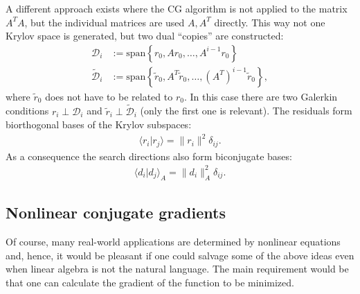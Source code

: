     A different approach exists where the CG algorithm is not applied to the matrix $A^T\!A$, but the individual matrices are used $A,A^T$ directly. This way not one Krylov space is generated, but two dual ``copies'' are constructed:
    \begin{align*}
        \mathcal{D}_i &:= \mathrm{span}\left\{r_0,Ar_0,\ldots,A^{i-1}r_0\right\}\\
        \widetilde{\mathcal{D}}_i &:= \mathrm{span}\left\{\widetilde{r}_0,A^T\widetilde{r}_0,\ldots,(A^T)^{i-1}\widetilde{r}_0\right\},
    \end{align*}
    where $\widetilde{r}_0$ does not have to be related to $r_0$. In this case there are two Galerkin conditions $r_i\perp\mathcal{D}_i$ and $\widetilde{r}_i\perp\widetilde{\mathcal{D}}_i$ (only the first one is relevant). The residuals form biorthogonal bases of the Krylov subspaces:
    \begin{gather}
        \langle r_i|r_j \rangle = \|r_i\|^2\delta_{ij}.
    \end{gather}
    As a consequence the search directions also form biconjugate bases:
    \begin{gather}
        \langle d_i|d_j \rangle_A = \|d_i\|_A^2\delta_{ij}.
    \end{gather}

\subsection{Nonlinear conjugate gradients}

    Of course, many real-world applications are determined by nonlinear equations and, hence, it would be pleasant if one could salvage some of the above ideas even when linear algebra is not the natural language. The main requirement would be that one can calculate the gradient of the function to be minimized.

